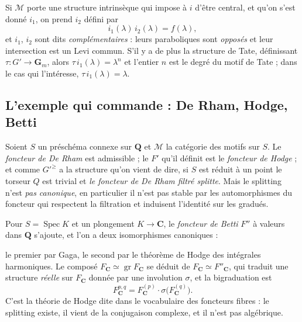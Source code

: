 \documentclass[11pt,a4paper]{article}
\begin{document}
Si $\mathcal{M}$ porte une structure intrinsèque qui impose à $i$ d'être
central, et qu'on s'est donné $i_{1}$, on prend $i_{2}$ défini
par
\[
i_{1}(\lambda)\,i_{2}(\lambda) = f(\lambda) ,
\]
et $i_{1}$, $i_{2}$ sont dits \emph{complémentaires} : leurs paraboliques sont
\emph{opposés} et leur intersection est un Levi commun. S'il y a de plus la
structure de Tate, définissant $\tau \colon G' \to \mathbf{G}_{m}$, alors
$\tau\,i_{1}(\lambda) = \lambda^{n}$ et l'entier $n$ est le degré du motif de
Tate ; dans le cas qui l'intéresse, $\tau\,i_{1}(\lambda) = \lambda$.

\subsection*{L'exemple qui commande : De Rham, Hodge, Betti}

Soient $S$ un préschéma connexe sur $\mathbf{Q}$ et $\mathcal{M}$ la catégorie
des motifs sur $S$. Le \emph{foncteur de De Rham} est admissible ; le $F'$
qu'il définit est le \emph{foncteur de Hodge} ; et comme
$G'^{\geqslant}$ a la structure qu'on vient de dire, si $S$ est réduit à un
point le torseur $Q$ est trivial et \emph{le foncteur de De Rham filtré
splitte}. Mais le splitting n'est \emph{pas
canonique}, en particulier il n'est pas stable par les automorphismes du
foncteur qui respectent la filtration et induisent l'identité sur les gradués.

Pour $S = \operatorname{Spec}K$ et un plongement $K \to \mathbf{C}$, le
\emph{foncteur de Betti} $F''$ à valeurs dans $\mathbf{Q}$ s'ajoute, et l'on a
deux isomorphismes canoniques :


le premier par Gaga, le second par le théorème de Hodge des intégrales
harmoniques. Le composé $F_{\mathbf{C}} \simeq \operatorname{gr}
F_{\mathbf{C}}$ se déduit de $F_{\mathbf{C}} \simeq F''_{\mathbf{C}}$, qui
traduit une structure \emph{réelle} sur $F_{\mathbf{C}}$ donnée par une
involution $\sigma$, et la bigraduation est
\[
F^{p,q}_{\mathbf{C}} = F^{(p)}_{\mathbf{C}} \cdot
\sigma\bigl( F^{(q)}_{\mathbf{C}} \bigr) .
\]
C'est la théorie de Hodge dite dans le vocabulaire des foncteurs fibres : le
splitting existe, il vient de la conjugaison complexe, et il n'est pas
algébrique.
\end{document}
